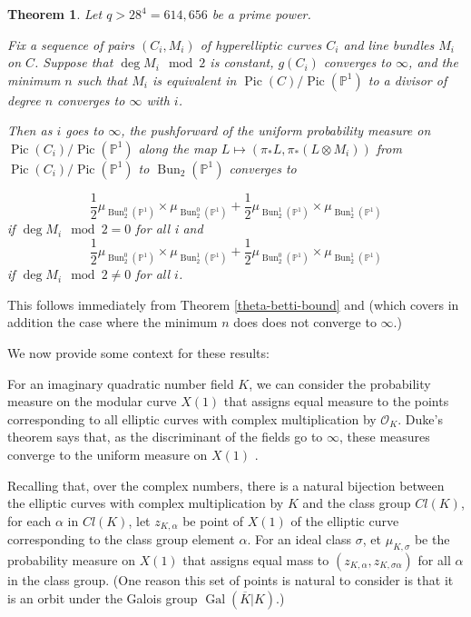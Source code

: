 \documentclass[12pt]{amsart}
\newtheorem{theorem}{Theorem}[section]
\theoremstyle{definition}
\theoremstyle{remark}
\def \Bun {\operatorname{Bun}}
\begin{document}
\begin{theorem}\label{equidistribution-statement} Let $q> 28^4=  614,656$ be a prime power.

Fix a sequence of pairs $(C_i,M_i)$ of hyperelliptic curves $C_i$ and line bundles $M_i$ on $C$. Suppose that $\deg M_i \mod 2$ is constant, $g(C_i)$ converges to $\infty$, and the minimum $n$ such that $M_i$ is equivalent in $\operatorname{Pic}(C)/ \operatorname{Pic}( \mathbb P^1) $ to a divisor of degree $n$ converges to $\infty$ with $i$. 

Then as $i$ goes to $\infty$, the pushforward of the uniform probability measure on  $\operatorname{Pic}(C_i)/ \operatorname{Pic}( \mathbb P^1) $ along the map $ L \mapsto (\pi_* L, \pi_* (L \otimes M_i)) $ from $\operatorname{Pic}(C_i)/ \operatorname{Pic}( \mathbb P^1) $  to $\Bun_2(\mathbb P^1)$ converges to 

\[ \frac{1}{2}  \mu_{ \operatorname{Bun}_2^0(\mathbb P^1)} \times \mu_{ \operatorname{Bun}_2^0(\mathbb P^1)} + \frac{1}{2} \mu_{ \operatorname{Bun}_2^1(\mathbb P^1)}\times \mu_{ \operatorname{Bun}_2^1(\mathbb P^1)}\] if $\deg M_i \mod 2=0$ for all i and \[ \frac{1}{2}  \mu_{ \operatorname{Bun}_2^0(\mathbb P^1)} \times \mu_{ \operatorname{Bun}_2^1(\mathbb P^1)} + \frac{1}{2} \mu_{ \operatorname{Bun}_2^0(\mathbb P^1)}\times \mu_{ \operatorname{Bun}_2^1(\mathbb P^1)}\] if $\deg M_i \mod 2 \neq 0$ for all $i$. \end{theorem} 

This follows immediately from Theorem \ref{theta-betti-bound} and \citep[Theorem 4.4]{TS} (which covers in addition the case where the minimum $n$ does does not converge to $\infty$.) 

We now provide some context for these results:

For an imaginary quadratic number field $K$, we can consider the probability measure on the modular curve $X(1)$ that assigns equal measure to the points corresponding to all elliptic curves with complex multiplication by $\mathcal O_K$. Duke's theorem says that, as the discriminant of the fields go to $\infty$, these measures converge to the uniform measure on $X(1)$ \citep{Duke}.

Recalling that, over the complex numbers, there is a natural bijection between the elliptic curves with complex multiplication by $K$ and the class group $Cl(K)$, for each $\alpha$ in $Cl(K)$, let $z_{K,\alpha}$ be point of $X(1)$ of the elliptic curve corresponding to the class group element $\alpha$. For an ideal class $\sigma$, et $\mu_{K,\sigma}$ be the probability measure on $X(1)$ that assigns equal mass to $(z_{K,\alpha}, z_{K, \sigma\alpha})$ for all $\alpha$ in the class group. (One reason this set of points is natural to consider is that it is an orbit under the Galois group $\operatorname{Gal}(\overline{K}|K)$.)
\end{document}
